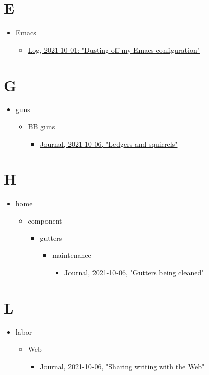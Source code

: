 \documentclass[11pt]{article}
\begin{document}
\section*{E}
\label{sec:org5e2c67b}
\begin{itemize}
\item Emacs
\begin{itemize}
\item \href{emsenn.org}{Log, 2021-10-01: "Dusting off my Emacs configuration"}
\end{itemize}
\end{itemize}
\section*{G}
\label{sec:org6bf8876}
\begin{itemize}
\item guns
\begin{itemize}
\item BB guns
\begin{itemize}
\item \href{emsenn.org}{Journal, 2021-10-06, "Ledgers and squirrels"}
\end{itemize}
\end{itemize}
\end{itemize}
\section*{H}
\label{sec:org5f7e830}
\begin{itemize}
\item home
\begin{itemize}
\item component
\begin{itemize}
\item gutters
\begin{itemize}
\item maintenance
\begin{itemize}
\item \href{emsenn.org}{Journal, 2021-10-06, "Gutters being cleaned"}
\end{itemize}
\end{itemize}
\end{itemize}
\end{itemize}
\end{itemize}
\section*{L}
\label{sec:orga00c661}
\begin{itemize}
\item labor
\begin{itemize}
\item Web
\begin{itemize}
\item \href{emsenn.org}{Journal, 2021-10-06, "Sharing writing with the Web"}
\end{itemize}
\end{itemize}
\end{itemize}
\end{document}

